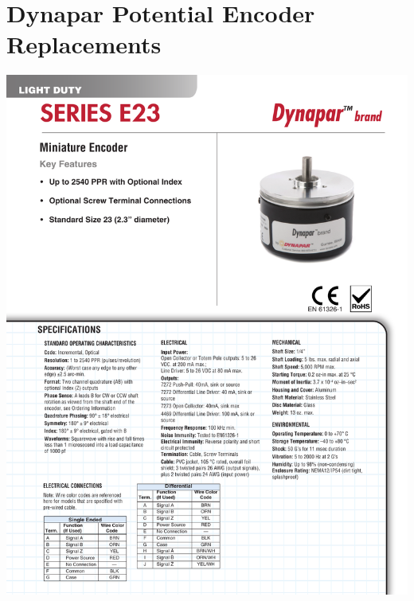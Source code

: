 \section{Dynapar Potential Encoder Replacements}
\begin{center}
	\includegraphics[width=5.5in]{afiles/E23_DS_701949_2.pdf}
	\label{e23} %
\end{center}
